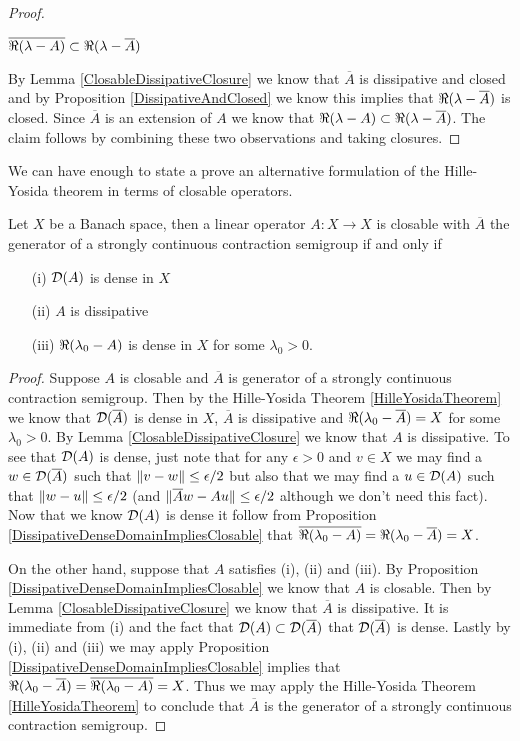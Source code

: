 \begin{proof}
\begin{clm} $\overline{\Re(\lambda -A)} \subset\Re(\lambda - \overline{A}) $
\end{clm}
By Lemma \ref{ClosableDissipativeClosure} we know that $\overline{A}$ is dissipative and closed and 
by Proposition \ref{DissipativeAndClosed} we know this implies that $\Re(\lambda - \overline{A})$ is closed.  Since $\overline{A}$ is an
extension of $A$ we know that $\Re(\lambda - A) \subset \Re(\lambda - \overline{A})$.  The claim follows by combining these two observations and taking closures.
\end{proof}

We can have enough to state a prove an alternative formulation of the Hille-Yosida theorem in terms of closable operators.
\begin{thm}\label{HilleYosidaTheoremClosable}Let $X$ be a Banach space, then a linear operator $A : X \to X$ is closable with $\overline{A}$ the generator of a strongly continuous contraction semigroup if and only if 
\begin{itemize}
\item[(i)] $ \mathcal{D}(A)$ is dense in $X$
\item[(ii)] $A$ is dissipative
\item[(iii)] $\Re(\lambda_0 -A)$ is dense in $X$ for some $\lambda_0 > 0$.
\end{itemize}
\end{thm}
\begin{proof}
Suppose $A$ is closable and $\overline{A}$ is generator of a strongly continuous contraction semigroup.  Then by the Hille-Yosida Theorem \ref{HilleYosidaTheorem} we know that $\mathcal{D}(\overline{A})$ is dense in $X$, $\overline{A}$ is dissipative and $\Re(\lambda_0 - \overline{A}) = X$ for some $\lambda_0 > 0$.  By Lemma \ref{ClosableDissipativeClosure} we know that $A$ is dissipative.   To see that $\mathcal{D}(A)$ is dense,  just note that for any $\epsilon > 0$ and $v \in X$ we may find a $w \in \mathcal{D}(\overline{A})$ such that $\lVert v - w \rVert \leq \epsilon/2$ but also that we may find a $u \in \mathcal{D}(A)$ such that $\lVert w - u \rVert \leq \epsilon/2$ (and $\lVert \overline{A}w - Au \rVert \leq \epsilon/2$ although we don't need this fact).  Now that we know $\mathcal{D}(A)$ is dense it follow from Proposition \ref{DissipativeDenseDomainImpliesClosable} that $\overline{\Re(\lambda_0 - A)} = \Re(\lambda_0 - \overline{A})=X$.

On the other hand, suppose that $A$ satisfies (i), (ii) and (iii).  By Proposition \ref{DissipativeDenseDomainImpliesClosable} we know that $A$ is closable.  Then by Lemma \ref{ClosableDissipativeClosure} we know that $\overline{A}$ is dissipative.  It is immediate from (i) and the fact that $\mathcal{D}(A) \subset \mathcal{D}(\overline{A})$ that $\mathcal{D}(\overline{A})$ is dense.  Lastly by (i), (ii) and (iii) we may apply Proposition \ref{DissipativeDenseDomainImpliesClosable} implies that $\Re(\lambda_0 - \overline{A}) = \overline{\Re(\lambda_0 - A)} =X$.  Thus we may apply the Hille-Yosida Theorem \ref{HilleYosidaTheorem} to conclude that $\overline{A}$ is the generator of a strongly continuous contraction semigroup.
\end{proof}

